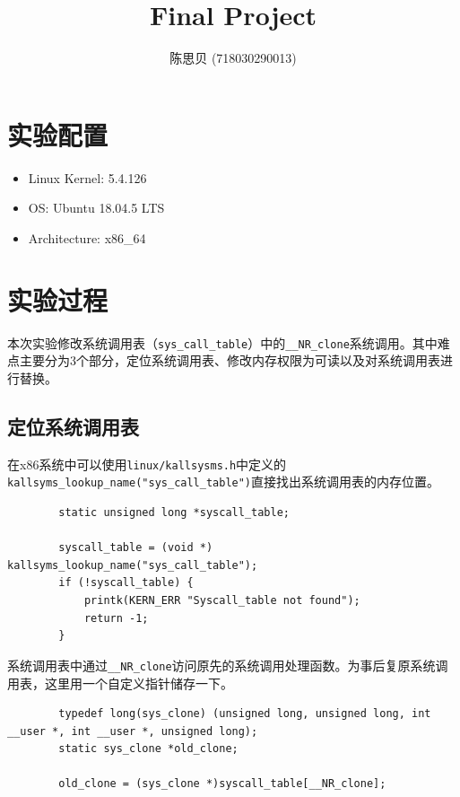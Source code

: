 \documentclass[UTF8]{ctexrep}
\title{
    \horrule{0.5pt} \\[0.4cm]
    \huge Final Project \\
    \horrule{2pt}
}
\author{
    陈思贝 (718030290013)
}
\date{
}
\begin{document}
    \maketitle

    \section{实验配置}

    \begin{itemize}
        \item Linux Kernel: 5.4.126
        \item OS: Ubuntu 18.04.5 LTS
        \item Architecture: x86\_64
    \end{itemize}
    \vspace{.3cm}

    \section{实验过程}

    本次实验修改系统调用表（\texttt{sys\_call\_table}）中的\texttt{\_\_NR\_clone}系统调用。其中难点主要分为3个部分，定位系统调用表、修改内存权限为可读以及对系统调用表进行替换。\\

    \subsection{定位系统调用表}

    在x86系统中可以使用\texttt{linux/kallsysms.h}中定义的\texttt{kallsyms\_lookup\_name("sys\_call\_table")}直接找出系统调用表的内存位置。

    \begin{lstlisting}
        static unsigned long *syscall_table;

        syscall_table = (void *) kallsyms_lookup_name("sys_call_table");
        if (!syscall_table) {
            printk(KERN_ERR "Syscall_table not found");
            return -1;
        }\end{lstlisting}

    系统调用表中通过\texttt{\_\_NR\_clone}访问原先的系统调用处理函数。为事后复原系统调用表，这里用一个自定义指针储存一下。
    \begin{lstlisting}
        typedef long(sys_clone) (unsigned long, unsigned long, int __user *, int __user *, unsigned long);
        static sys_clone *old_clone;
        
        old_clone = (sys_clone *)syscall_table[__NR_clone];\end{lstlisting}
\end{document}
